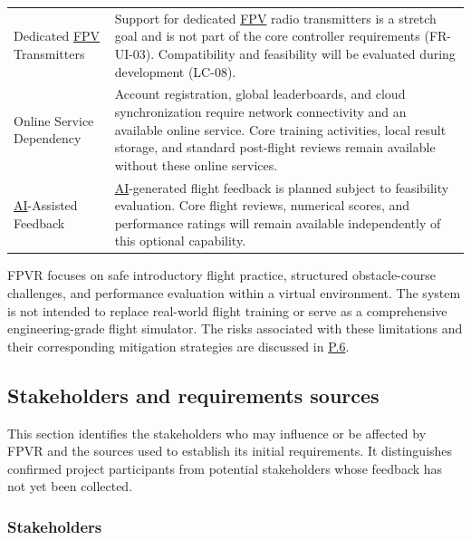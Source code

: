 \documentclass[12pt]{article}
\begin{document}
\begin{table}[htbp]
\begin{tabularx}{\textwidth}{
    @{}p{4cm} X@{}
}
\addlinespace

Dedicated \hyperlink{glos:FPV}{FPV} Transmitters &
Support for dedicated \hyperlink{glos:FPV}{FPV} radio transmitters is a stretch
goal and is not part of the core controller requirements
(FR-UI-03). Compatibility and feasibility will be evaluated
during development (LC-08). \\

\addlinespace

Online Service Dependency &
Account registration, global leaderboards, and
cloud synchronization require network connectivity
and an available online service. Core training
activities, local result storage, and standard
post-flight reviews remain available without
these online services. \\

\addlinespace

\hyperlink{glos:AI}{AI}-Assisted Feedback &
\hyperlink{glos:AI}{AI}-generated flight feedback is planned subject to
feasibility evaluation. Core flight reviews, numerical
scores, and performance ratings will remain available
independently of this optional capability. \\

\bottomrule
\end{tabularx}
\end{table}

FPVR focuses on safe introductory flight practice,
structured obstacle-course challenges, and performance
evaluation within a virtual environment. The system
is not intended to replace real-world flight training
or serve as a comprehensive engineering-grade flight
simulator. The risks associated with these limitations and their corresponding
mitigation strategies are discussed in
\hyperref[p6]{P.6}.


\subsection{Stakeholders and requirements sources}\label{g7}

This section identifies the stakeholders who may influence
or be affected by FPVR and the sources used to establish
its initial requirements. It distinguishes confirmed
project participants from potential stakeholders whose
feedback has not yet been collected.

\subsubsection{Stakeholders}
\end{document}
